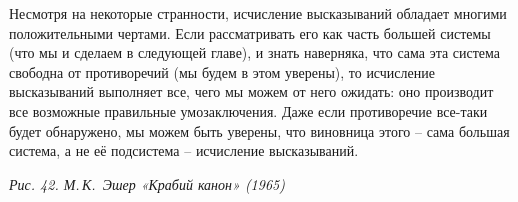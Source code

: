 \documentclass[../main.tex]{subfiles}
\begin{document}
Несмотря на некоторые странности, исчисление высказываний обладает многими положительными чертами. Если рассматривать его как часть большей системы (что мы и сделаем в следующей главе), и знать наверняка, что сама эта система свободна от противоречий (мы будем в этом уверены), то исчисление высказываний выполняет все, чего мы можем от него ожидать: оно производит все возможные правильные умозаключения. Даже если противоречие все-таки будет обнаружено, мы можем быть уверены, что виновница этого \--- сама большая система, а не её подсистема \--- исчисление высказываний.

\emph{Рис. 42. М.\,К.~Эшер «Крабий канон» (1965)}
\end{document}
